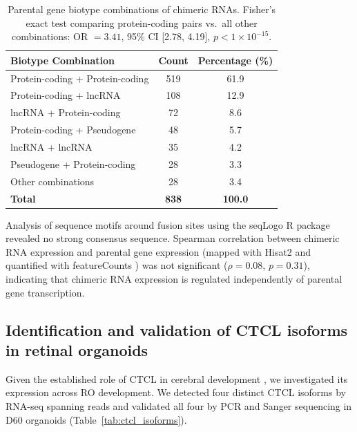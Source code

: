 \documentclass[11pt]{article}
\begin{document}
\begin{table}[H]
\centering
\caption{Parental gene biotype combinations of chimeric RNAs. Fisher's exact test comparing protein-coding pairs vs.\ all other combinations: OR $= 3.41$, 95\% CI [2.78, 4.19], $p < 1 \times 10^{-15}$.}
\label{tab:biotype}
\begin{tabular}{lcc}
\toprule
\textbf{Biotype Combination} & \textbf{Count} & \textbf{Percentage (\%)} \\
\midrule
Protein-coding + Protein-coding & 519 & 61.9 \\
Protein-coding + lncRNA & 108 & 12.9 \\
lncRNA + Protein-coding & 72 & 8.6 \\
Protein-coding + Pseudogene & 48 & 5.7 \\
lncRNA + lncRNA & 35 & 4.2 \\
Pseudogene + Protein-coding & 28 & 3.3 \\
Other combinations & 28 & 3.4 \\
\midrule
\textbf{Total} & \textbf{838} & \textbf{100.0} \\
\bottomrule
\end{tabular}
\end{table}

Analysis of sequence motifs around fusion sites using the seqLogo R package \citep{schneider2010seqlogo} revealed no strong consensus sequence. Spearman correlation between chimeric RNA expression and parental gene expression (mapped with Hisat2 and quantified with featureCounts \citep{kim2019hisat2, liao2014featurecounts}) was not significant ($\rho = 0.08$, $p = 0.31$), indicating that chimeric RNA expression is regulated independently of parental gene transcription.

\subsection{Identification and validation of CTCL isoforms in retinal organoids}

Given the established role of CTCL in cerebral development \citep{gao2022ctcl}, we investigated its expression across RO development. We detected four distinct CTCL isoforms by RNA-seq spanning reads and validated all four by PCR and Sanger sequencing in D60 organoids (Table~\ref{tab:ctcl_isoforms}).
\end{document}
